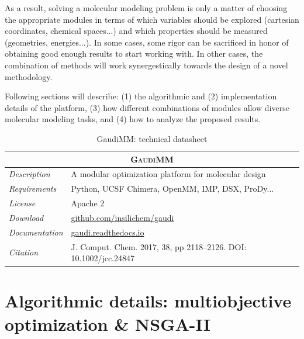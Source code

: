 As a result, solving a molecular modeling problem is only a matter of choosing the appropriate modules in terms of which variables should be explored (cartesian coordinates, chemical spaces...) and which properties should be measured (geometries, energies...). In some cases, some rigor can be sacrificed in honor of obtaining good enough results to start working with. In other cases, the combination of methods will work synergestically towards the design of a novel methodology.

Following sections will describe: (1) the algorithmic and (2) implementation details of the platform, (3) how different combinations of modules allow diverse molecular modeling tasks, and (4) how to analyze the proposed results.



\begin{table}[hbtp]
	\caption{GaudiMM: technical datasheet}
	\footnotesize
	\newcommand{\tableheading}[1]{\multicolumn{2}{c}{\textsc{#1}}}
	\begin{tabularx}{\textwidth}{RL}
		\toprule
		\tableheading{GaudiMM} \\
		\toprule
		\textit{Description} & A modular optimization platform for molecular design \\
		\midrule
		\textit{Requirements} & Python, UCSF Chimera, OpenMM, IMP, DSX, ProDy... \\
		\midrule
		\textit{License} & Apache 2 \\
		\midrule
		\textit{Download} & \href{https://github.com/insilichem/gaudi}{github.com/insilichem/gaudi} \\
		\midrule
		\textit{Documentation} & \href{https://gaudi.readthedocs.io}{gaudi.readthedocs.io} \\
		\midrule
		\textit{Citation} & J. Comput. Chem. 2017, 38, pp 2118–2126. DOI: 10.1002/jcc.24847 \\
		\bottomrule

	\end{tabularx}
\end{table}



\section{Algorithmic details: multiobjective optimization \& NSGA-II}

